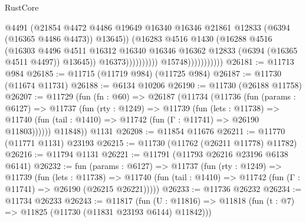 \begin{lexlean}{RustCore}
\begin{coremodule}
                                              @4491
                                              (@21854
                                                @4472
                                                @4486
                                                @19649
                                                @16340
                                                @16346
                                                @21861
                                                @12833
                                                (@6394 (@16365 @4486 @4473))
                                                @13645))
                                            (@16283
                                              @4516
                                              @1430
                                              (@16288
                                                @4516
                                                (@16303
                                                  @4496
                                                  @4511
                                                  @16312
                                                  @16340
                                                  @16346
                                                  @16362
                                                  @12833
                                                  (@6394 (@16365 @4511 @4497))
                                                  @13645))
                                              @16373))))))))))
                          @15748)))))))))))
@26181 := @11713 @984
@26185 := @11715 (@11719 @984) (@11725 @984)
@26187 := @11730 (@11674 @11731)
@26188 := @6134 @10206
@26190 := @11730 (@26188 @11758)
@26207 := @11729
    (fun (fn : @60) =>
    @26187
      (@11734
        (@11736
          (fun (params : @6127) =>
          @11737
            (fun (rty : @1249) =>
            @11739
              (fun (lets : @11738) =>
              @11740 (fun (tail : @1410) => @11742 (fun (Γ : @11741) => @26190 @11803))))))
        @11848))
    @1131
@26208 := @11854 @11676
@26211 := @11770 (@11771 @1131) @23193
@26215 := @11730 (@11762 (@26211 @11778) @11782)
@26216 := @11794 @1131
@26221 := @11791 (@11793 @26216 @23196 @6138 @6141)
@26232 := fun (params : @6127) =>
  @11737
    (fun (rty : @1249) =>
    @11739
      (fun (lets : @11738) =>
      @11740 (fun (tail : @1410) => @11742 (fun (Γ : @11741) => @26190 (@26215 @26221)))))
@26233 := @11736 @26232
@26234 := @11734 @26233
@26243 := @11817
    (fun (U : @11816) => @11818 (fun (t : @7) => @11825 (@11730 (@11831 @23193 @6144) @11842)))

\end{coremodule}
\end{lexlean}
